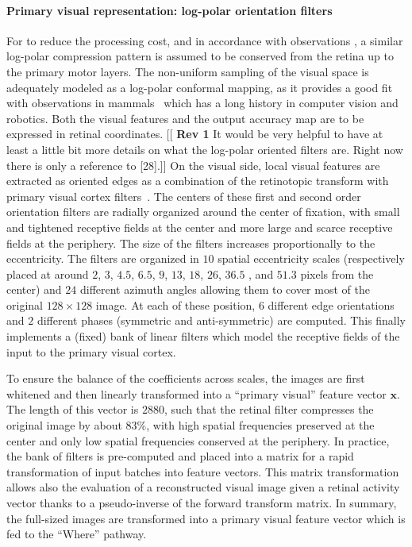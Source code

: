 \paragraph{Primary visual representation: log-polar orientation filters}
For to reduce the processing cost, and in accordance with observations \cite{connolly1984representation,sparks1987sensory}, a similar log-polar compression pattern is assumed to be conserved from the retina up to the primary motor layers.
The non-uniform sampling of the visual space is adequately modeled as a log-polar conformal mapping, as it provides a good fit with observations in mammals~\cite{Traver10} which has a long history in computer vision and robotics. 
Both the visual features and the output accuracy map are to be expressed in retinal coordinates. 
{\color{magenta} [[ \textbf{Rev 1} It would be very helpful to have at least a little bit more details on what the log-polar oriented filters are. Right now there is only a reference to [28].]]} 
On the visual side, local visual features are extracted as oriented edges as a combination of the retinotopic transform with primary visual cortex filters~\cite{Fischer2007a}. The centers of these first and second order orientation filters are radially organized around the center of fixation, with small and tightened receptive fields at the center and more large and scarce receptive fields at the periphery.
The size of the filters increases proportionally to the eccentricity.  The filters are organized in $10$ spatial eccentricity scales (respectively placed at around $2$, $3$, $4.5$, $6.5$, $9$, $13$, $18$, $26$, $36.5$ , and $51.3$ pixels from the center) and $24$ different azimuth angles allowing them to cover most of the original $128 \times 128 $ image. At each of these position,  $6$ different edge orientations and $2$ different phases (symmetric and anti-symmetric) are computed. This finally implements a (fixed) bank of linear filters which model the receptive fields of the input to the primary visual cortex.

To ensure the balance of the coefficients across scales, the images are first whitened and then linearly transformed into a ``primary visual'' feature vector $\boldsymbol{x}$.  The length of this vector is $2880$, such that the retinal filter compresses the original image by about 83\%, with high spatial frequencies preserved at the center and only low spatial frequencies conserved at the periphery. In practice, the bank of filters is pre-computed and placed into a matrix for a rapid transformation of input batches into  feature vectors. This matrix transformation allows also the evaluation of a reconstructed visual image given a retinal activity vector thanks to a pseudo-inverse of the forward transform matrix. In summary, the full-sized images are transformed into a primary visual feature vector which is fed to the ``Where'' pathway.

